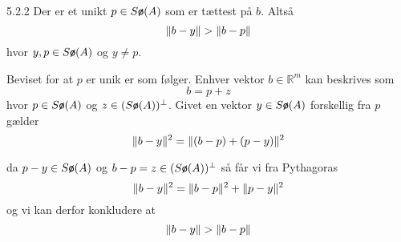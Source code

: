\begin{proposition}{5.2.2}
	Der er et unikt $p \in \so (A)$ som er tættest på $b$. Altså
	\[
		\norm{b-y} > \norm{b-p}
	\]
	hvor $y, p \in \so(A)$ og $y \not= p$.
\end{proposition}

\begin{bevis}
	Beviset for at $p$ er unik er som følger. Enhver vektor $b \in
	\mathbb{R}^m$ kan beskrives som
	\[
		b = p + z
	\]
	hvor $p \in \so(A)$ og $z \in (\so(A))^\bot$. Givet en vektor $y \in
	\so(A)$ forskellig fra $p$ gælder
	\[
		\norm{b-y}^2 = \norm{(b-p)+(p-y)}^2
	\]
	
	da $p-y \in \so(A)$ og $b-p = z \in (\so(A))^\bot$ så får vi fra Pythagoras
	\[
		\norm{b-y}^2 = \norm{b-p}^2 + \norm{p-y}^2
	\]
	og vi kan derfor konkludere at
	\[
		\norm{b-y} > \norm{b-p}
	\]
\end{bevis}
